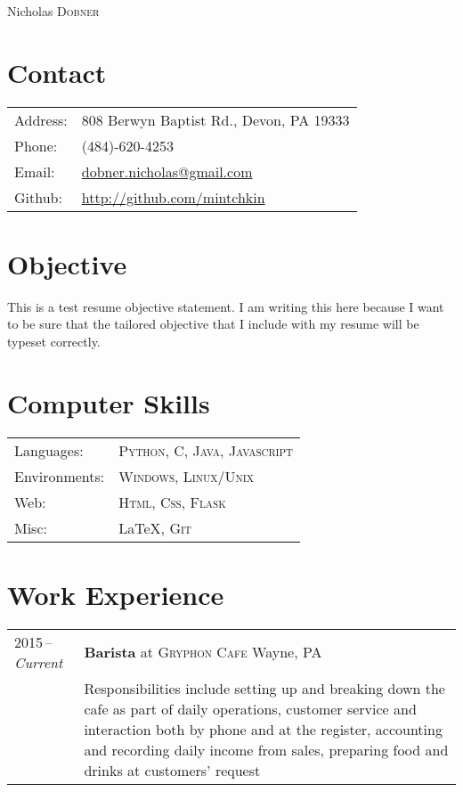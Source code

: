\documentclass[a4paper,10pt]{article}
\begin{document}
\pagestyle{empty} %

\newfontfamily{} %

\begin{center}
    \Huge Nicholas \textsc{Dobner}
\end{center}

\section{Contact}
\begin{tabular}{@{}>{\raggedleft\arraybackslash}m{6.5em}l}
    Address:   & 808 Berwyn Baptist Rd., Devon, PA 19333 \\
    Phone:     & (484)-620-4253 \\
    Email:     & \href{mailto:dobner.nicholas@gmail.com}{dobner.nicholas@gmail.com} \\
    Github:    & \href{https://github.com/mintchkin}{http://github.com/mintchkin}
\end{tabular}

\section{Objective}
This is a test resume objective statement. I am writing this here because I want to be sure that the
tailored objective that I include with my resume will be typeset correctly.

\section{Computer Skills}
\begin{tabular}{@{}>{\raggedleft\arraybackslash}m{6.5em}l}
    Languages:      & \textsc{Python}, \textsc{C}, \textsc{Java}, \textsc{Javascript} \\
    Environments:   & \textsc{Windows}, \textsc{Linux/Unix} \\
    Web:            & \textsc{Html}, \textsc{Css}, \textsc{Flask} \\
    Misc:           & {\LaTeX}, \textsc{Git}
\end{tabular}

\section{Work Experience}
\begin{tabularx}{\textwidth}{@{}p{6em}|X@{}}
    2015\,--\,\emph{Current} & \textbf{Barista} at \textsc{Gryphon Cafe} \hfill Wayne, PA \\
    & \footnotesize{Responsibilities include setting up and breaking down the cafe as part of daily operations, customer service and interaction both by phone and at the register, accounting and recording daily income from sales, preparing food and drinks at customers' request} \\
\end{tabularx}
\end{document}
